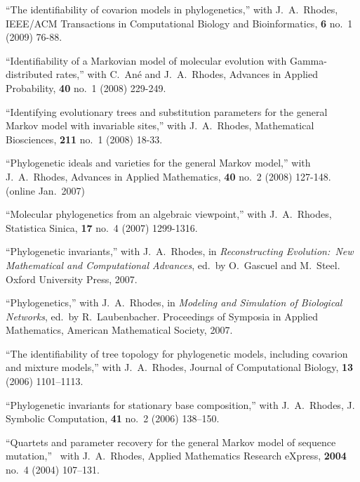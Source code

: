 \documentclass[10pt]{report}
\begin{document}
{{\begin{revnumerate}[44]
\item
``The identifiability of covarion models in phylogenetics,''
with J.~A.~Rhodes, IEEE/ACM Transactions in Computational Biology and
Bioinformatics, {\bf 6} no.~1 (2009) 76-88.

\item
``Identifiability of a Markovian model of molecular evolution
with Gamma-distributed rates,''
with C.~An\'e and J.~A.~Rhodes, Advances in Applied Probability,
{\bf 40} no.~1 (2008) 229-249.

\item
``Identifying evolutionary trees and substitution parameters
for the general Markov model with invariable sites,'' with
J.~A.~Rhodes, Mathematical Biosciences, {\bf 211} no.~1 (2008) 18-33.

\item
``Phylogenetic ideals and varieties for the general Markov model,''
with J.~A.~Rhodes, Advances in Applied Mathematics, {\bf 40} no.~2
(2008) 127-148.
(online Jan.~2007)

\item
``Molecular phylogenetics from an algebraic viewpoint,'' with J.~A.~Rhodes,
Statistica Sinica, {\bf 17} no.~4 (2007) 1299-1316.

\item
``Phylogenetic invariants,'' with J.~A.~Rhodes, in
\emph{Reconstructing Evolution:~New Mathematical and Computational Advances}, ed.~by O.~Gascuel and
M.~Steel. Oxford University Press, 2007.

\item
``Phylogenetics,'' with J.~A.~Rhodes, in \emph{Modeling and Simulation of
Biological Networks}, ed.~by R.~Laubenbacher. Proceedings of
Symposia in Applied Mathematics, American Mathematical Society,
2007.

\item
``The identifiability of tree topology for phylogenetic models,
including covarion and mixture models,'' with J.~A.~Rhodes, Journal
of Computational Biology, {\bf 13}  (2006) 1101--1113.

\item
``Phylogenetic invariants for stationary base composition,''
with J.~A.~Rhodes, J. Symbolic Computation, {\bf 41} no.~2
(2006) 138--150.

\item
``Quartets and parameter recovery for the general Markov model of
sequence mutation,'' \ with J.~A.~Rhodes, Applied Mathematics
Research eXpress, {\bf 2004} no.~4 (2004) 107--131.


\end{revnumerate}}}
\end{document}
